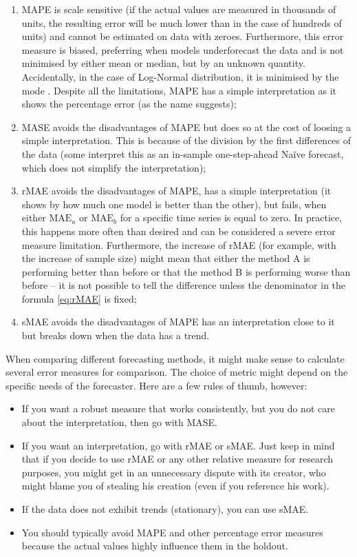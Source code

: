 \documentclass[
]{book}
\providecommand{\tightlist}{%
  \setlength{\itemsep}{0pt}\setlength{\parskip}{0pt}}
\theoremstyle{definition}
\theoremstyle{definition}
\theoremstyle{definition}
\theoremstyle{definition}
\theoremstyle{remark}
\begin{document}
\begin{enumerate}
\def\labelenumi{\arabic{enumi}.}
\tightlist
\item
  MAPE is scale sensitive (if the actual values are measured in thousands of units, the resulting error will be much lower than in the case of hundreds of units) and cannot be estimated on data with zeroes. Furthermore, this error measure is biased, preferring when models underforecast the data \citep[see, for example,][]{Makridakis1993} and is not minimised by either mean or median, but by an unknown quantity. Accidentally, in the case of Log-Normal distribution, it is minimised by the mode \citep[see discussion in][]{Kolassa2016}. Despite all the limitations, MAPE has a simple interpretation as it shows the percentage error (as the name suggests);
\item
  MASE avoids the disadvantages of MAPE but does so at the cost of loosing a simple interpretation. This is because of the division by the first differences of the data (some interpret this as an in-sample one-step-ahead Naïve forecast, which does not simplify the interpretation);
\item
  rMAE avoids the disadvantages of MAPE, has a simple interpretation (it shows by how much one model is better than the other), but fails, when either \(\mathrm{MAE}_a\) or \(\mathrm{MAE}_b\) for a specific time series is equal to zero. In practice, this happens more often than desired and can be considered a severe error measure limitation. Furthermore, the increase of rMAE (for example, with the increase of sample size) might mean that either the method A is performing better than before or that the method B is performing worse than before -- it is not possible to tell the difference unless the denominator in the formula \eqref{eq:rMAE} is fixed;
\item
  sMAE avoids the disadvantages of MAPE has an interpretation close to it but breaks down when the data has a trend.
\end{enumerate}

When comparing different forecasting methods, it might make sense to calculate several error measures for comparison. The choice of metric might depend on the specific needs of the forecaster. Here are a few rules of thumb, however:

\begin{itemize}
\tightlist
\item
  If you want a robust measure that works consistently, but you do not care about the interpretation, then go with MASE.
\item
  If you want an interpretation, go with rMAE or sMAE. Just keep in mind that if you decide to use rMAE or any other relative measure for research purposes, you might get in an unnecessary dispute with its creator, who might blame you of stealing his creation (even if you reference his work).
\item
  If the data does not exhibit trends (stationary), you can use sMAE.
\item
  You should typically avoid MAPE and other percentage error measures because the actual values highly influence them in the holdout.
\end{itemize}
\end{document}
